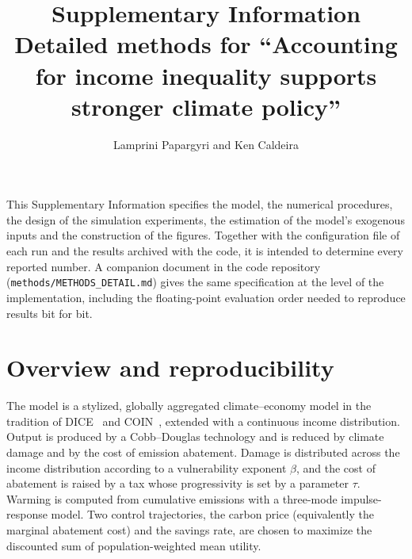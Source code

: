 \documentclass[11pt]{article}
\title{Supplementary Information\\[4pt]
\large Detailed methods for ``Accounting for income inequality supports stronger climate policy''}
\author{Lamprini Papargyri and Ken Caldeira}
\date{}
\begin{document}
\maketitle

\noindent
This Supplementary Information specifies the model, the numerical procedures, the
design of the simulation experiments, the estimation of the model's exogenous
inputs and the construction of the figures. Together with the configuration
file of each run and the results archived with the code, it is intended to
determine every reported number. A companion document in the code repository
(\texttt{methods/METHODS\_DETAIL.md}) gives the same specification at the level of the
implementation, including the floating-point evaluation order needed to
reproduce results bit for bit.

\tableofcontents

\section{Overview and reproducibility}
\label{sec:overview}

The model is a stylized, globally aggregated climate--economy model in the
tradition of DICE~\cite{BarrageNordhaus2024} and COIN~\cite{Caldeira2023},
extended with a continuous income distribution. Output is produced by a
Cobb--Douglas technology and is reduced by climate damage and by the cost of
emission abatement. Damage is distributed across the income distribution
according to a vulnerability exponent $\beta$, and the cost of abatement is
raised by a tax whose progressivity is set by a parameter $\tau$. Warming is
computed from cumulative emissions with a three-mode impulse-response model.
Two control trajectories, the carbon price (equivalently the marginal abatement
cost) and the savings rate, are chosen to maximize the discounted sum of
population-weighted mean utility.
\end{document}
